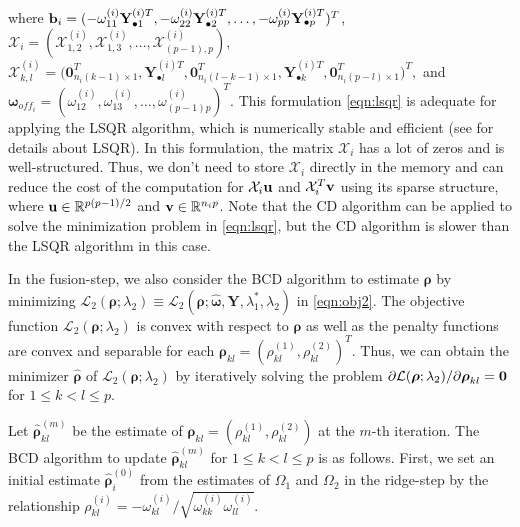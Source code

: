\documentclass[useAMS,usenatbib,referee]{bio}
\newcommand{\bs}{\boldsymbol}
\begin{document}
{{where ${\bf b}_i = ( -\omega^{(i)}_{11} {\bf Y}_{\bullet 1}^{(i)T}, -\omega^{(i)}_{22} {\bf Y}_{\bullet 2}^{(i)T}, \ldots, -\omega^{(i)}_{pp} {\bf Y}_{\bullet p}^{(i)T})^T$,
${\mathcal X}_i = ({\mathcal X}^{(i)}_{1,2}, {\mathcal X}^{(i)}_{1,3}, \ldots, {\mathcal  X}^{(i)}_{(p-1),p})$,
$
\mathcal{X}^{(i)}_{k,l}
= \big( \mathbf{0}_{n_i(k-1)\times 1}^{ T},
\mathbf{Y}_{\bullet l}^{(i)T}, \mathbf{0}_{n_i(l-k-1)\times 1}^T
, \mathbf{Y}_{\bullet k}^{(i)T}, \mathbf{0}_{n_i(p-l)\times 1}^T
\big)^T,
$   
and
$\bs{\omega}_{off_i} = (\omega^{(i)}_{12}, \omega^{(i)}_{13},\ldots,\omega^{(i)}_{(p-1)p})^T$.
This formulation \eqref{eqn:lsqr} is adequate for applying the LSQR algorithm, which is numerically stable and efficient (see \cite{Paige:1982} for details about LSQR). 
In this formulation, the matrix ${\mathcal X}_i$ has a lot of zeros and is well-structured.
Thus, we don't need to store ${\mathcal X}_i$ directly in the memory and can reduce the cost of the computation for ${\mathcal X}_i {\bf u}$ and ${\mathcal X}_i^T {\bf v}$ using its sparse structure, 
where ${\bf u} \in \mathbb{R}^{p(p-1)/2}$ and ${\bf v} \in \mathbb{R}^{n_i p}$.
Note that the CD algorithm can be applied to solve the minimization problem in \eqref{eqn:lsqr}, but the CD algorithm is slower than the LSQR algorithm in this case.


In the fusion-step, we also consider the BCD algorithm to estimate ${\bs{\rho}}$ by minimizing
${\mathcal L}_2(\bs{\rho};\lambda_2)\equiv {\mathcal L}_2(\bs{\rho};\hat{\bs{\omega}},\mathbf{Y},\lambda_1^*,\lambda_2)$ in \eqref{eqn:obj2}. The objective function ${\mathcal L}_2(\bs{\rho};\lambda_2)$ is convex with respect to $\bs{\rho}$ as well as the penalty functions are convex and separable for each $\bs{\rho}_{kl} = (\rho^{(1)}_{kl}, \rho^{(2)}_{kl})^T$. Thus, we can obtain the minimizer $\hat{\bs{\rho}}$ of ${\mathcal L}_2(\bs{\rho};\lambda_2)$ by iteratively solving the problem $\partial {\mathcal L}(\bs{\rho};\lambda_2) / \partial \bs{\rho}_{kl} = {\bf 0}$ for $1 \leq k <l \leq p $.


Let $\widehat{\bs{\rho}}_{kl}^{(m)}$ be the estimate of $\bs{\rho}_{kl}=(\rho_{kl}^{(1)},\rho_{kl}^{(2)})$ at the $m$-th iteration.
The BCD algorithm to update $\widehat{\bs{\rho}}_{kl}^{(m)}$ for $1\le k<l \le p$ is as follows. 
First, we set an initial estimate $\widehat{\bs{\rho}}_i^{(0)}$ from the estimates of $\Omega_1$ and $\Omega_2$ in the ridge-step by the relationship $\rho^{(i)}_{kl} = -\omega^{(i)}_{kl}/\sqrt{\omega^{(i)}_{kk} \omega^{(i)}_{ll}}$.


}}
\end{document}
